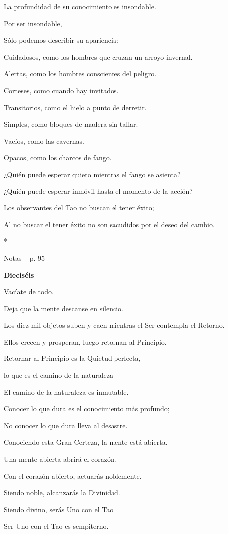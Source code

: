 La profundidad de su conocimiento es insondable.

Por ser insondable,

Sólo podemos describir su apariencia:

Cuidadosos, como los hombres que cruzan un arroyo invernal.

Alertas, como los hombres conscientes del peligro.

Corteses, como cuando hay invitados.

Transitorios, como el hielo a punto de derretir.

Simples, como bloques de madera sin tallar.

Vacíos, como las cavernas.

Opacos, como los charcos de fango.

¿Quién puede esperar quieto mientras el fango se asienta?

¿Quién puede esperar inmóvil hasta el momento de la acción?

Los observantes del Tao no buscan el tener éxito;

Al no buscar el tener éxito no son sacudidos por el deseo del cambio.

*

Notas -- p. 95

\textbf{Dieciséis}

Vacíate de todo.

Deja que la mente descanse en silencio.

Los diez mil objetos suben y caen mientras el Ser contempla el Retorno.

Ellos crecen y prosperan, luego retornan al Principio.

Retornar al Principio es la Quietud perfecta,

lo que es el camino de la naturaleza.

El camino de la naturaleza es inmutable.

Conocer lo que dura es el conocimiento más profundo;

No conocer lo que dura lleva al desastre.

Conociendo esta Gran Certeza, la mente está abierta.

Una mente abierta abrirá el corazón.

Con el corazón abierto, actuarás noblemente.

Siendo noble, alcanzarás la Divinidad.

Siendo divino, serás Uno con el Tao.

Ser Uno con el Tao es sempiterno.

